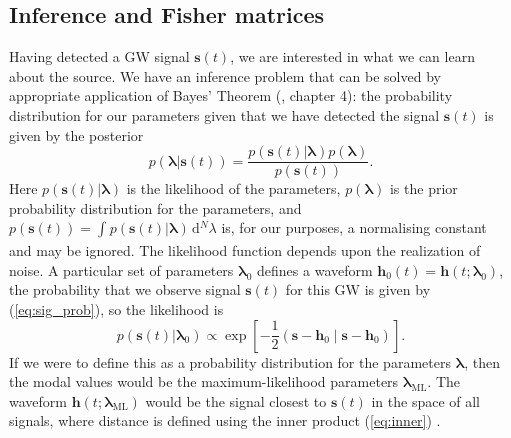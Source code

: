 \documentclass[useAMS,usedcolumn,usegraphicx,usenatbib]{mn2e}
\newcommand{\eqnref}[1]{(\ref{eq:#1})}
\newcommand{\sub}[1]{\ensuremath{_\mathrm{#1}}}
\newcommand{\dd}{\ensuremath{\mathrm{d}}}
\newcommand{\intd}[4]{\ensuremath{\int_{#1}^{#2}{#3}\,\dd{#4}}}
\newcommand{\recip}[1]{\ensuremath{\frac{1}{#1}}}
\newcommand{\innerprod}[2]{\ensuremath{\left({#1}\middle|{#2}\right)}}
\begin{document}
\subsection{Inference and Fisher matrices}

Having detected a GW signal $\boldsymbol{s}(t)$, we are interested in what we can learn about the source. We have an inference problem that can be solved by appropriate application of Bayes' Theorem (\citealt{Jaynes2003}, chapter 4): the probability distribution for our parameters given that we have detected the signal $\boldsymbol{s}(t)$ is given by the posterior
\begin{equation}
p(\boldsymbol{\lambda}|\boldsymbol{s}(t)) = \frac{p(\boldsymbol{s}(t)|\boldsymbol{\lambda})p(\boldsymbol{\lambda})}{p(\boldsymbol{s}(t))}.
\end{equation}
Here $p(\boldsymbol{s}(t)|\boldsymbol{\lambda})$ is the likelihood of the parameters, $p(\boldsymbol{\lambda})$ is the prior probability distribution for the parameters, and $p(\boldsymbol{s}(t)) = \intd{}{}{p(\boldsymbol{s}(t)|\boldsymbol{\lambda})}{^N \lambda}$ is, for our purposes, a normalising constant and may be ignored. The likelihood function depends upon the realization of noise. A particular set of parameters $\boldsymbol{\lambda}_0$ defines a waveform $\boldsymbol{h}_0(t) = \boldsymbol{h}(t; \boldsymbol{\lambda}_0)$, the probability that we observe signal $\boldsymbol{s}(t)$ for this GW is given by \eqnref{sig_prob}, so the likelihood is
\begin{equation}
p(\boldsymbol{s}(t)|\boldsymbol{\lambda}_0) \propto \exp\left[-\recip{2}\innerprod{\boldsymbol{s}-\boldsymbol{h}_0}{\boldsymbol{s}-\boldsymbol{h}_0}\right].
\end{equation}
If we were to define this as a probability distribution for the parameters $\boldsymbol{\lambda}$, then the modal values would be the maximum-likelihood parameters $\boldsymbol{\lambda}\sub{ML}$. The waveform $\boldsymbol{h}(t; \boldsymbol{\lambda}\sub{ML})$ would be the signal closest to $\boldsymbol{s}(t)$ in the space of all signals, where distance is defined using the inner product \eqnref{inner} \citep{Cutler1994}.
\end{document}

